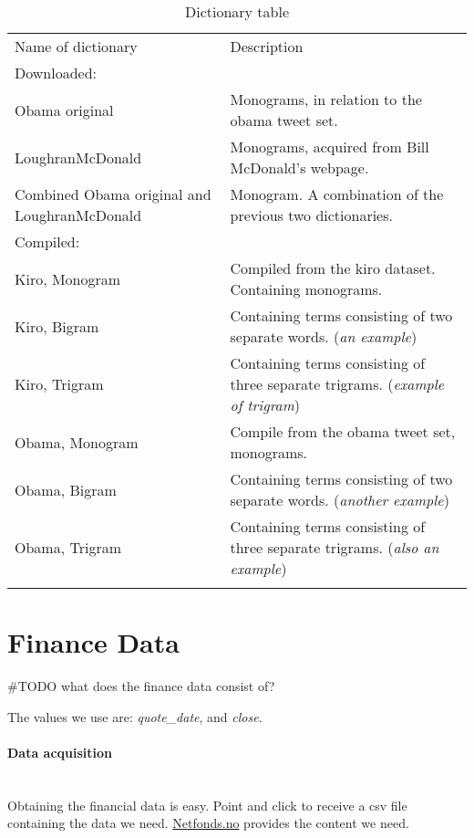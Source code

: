 \begin{table}
\centering
\label{tbl:dictionaries}
\caption{Dictionary table}
\begin{tabular}{ p{5cm} p{7cm} }
Name of dictionary & Description \\
Downloaded:& \\
\hline
Obama original & Monograms, in relation to the obama tweet set. \\
LoughranMcDonald & Monograms, acquired from Bill McDonald's webpage.\\
Combined Obama original and LoughranMcDonald & Monogram. A combination of
the previous two dictionaries. \\

Compiled:& \\
\hline
Kiro, Monogram & Compiled from the kiro dataset. Containing
monograms. \\
Kiro, Bigram &  Containing terms consisting of two separate words. (\textit{an 
example}) \\
Kiro, Trigram & Containing terms consisting of three separate trigrams.
(\textit{example of trigram})\\
Obama, Monogram & Compile from the obama tweet set, monograms. \\
Obama, Bigram & Containing terms consisting of two separate words.
(\textit{another example}) \\
Obama, Trigram & Containing terms consisting of three separate trigrams.
(\textit{also an example})\\

	\label{data:dictionary_list}
\end{tabular}
\end{table}
%

\section{Finance Data}\label{data:finance}
#TODO what does the finance data consist of?

The values we use are: \textit{quote\_date}, and \textit{close}.

\paragraph{Data acquisition}
\hspace{0pt}\\
Obtaining the financial data is easy. Point and click to receive a csv file
containing the data we need. \url{Netfonds.no} provides the content we need.

